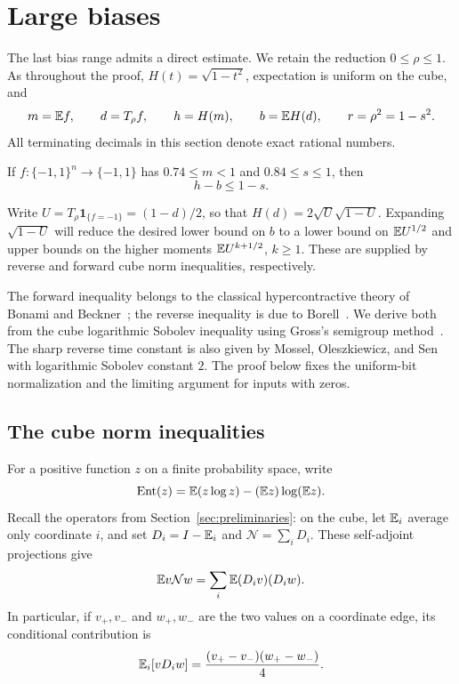 \section{Large biases}\label{sec:large-bias}

The last bias range admits a direct estimate. We retain the reduction
$0\le\rho\le1$. As throughout the proof, $H(t)=\sqrt{1-t^2}$,
expectation is uniform on the cube, and
\[
 m=\mathbb E f,\qquad d=T_\rho f,\qquad h=H(m),\qquad
 b=\mathbb E H(d),\qquad r=\rho^2=1-s^2.
\]
All terminating decimals in this section denote exact rational numbers.

\begin{proposition}\label{prop:large-bias}
If $f:\{-1,1\}^n\to\{-1,1\}$ has $0.74\le m<1$ and
$0.84\le s\le1$, then
\[
 h-b\le1-s.
\]
\end{proposition}

Write \(U=T_\rho\mathbf1_{\{f=-1\}}=(1-d)/2\), so that
\(H(d)=2\sqrt U\sqrt{1-U}\). Expanding \(\sqrt{1-U}\) will
reduce the desired lower bound on \(b\) to a lower bound on
\(\mathbb E U^{1/2}\) and upper bounds on the higher moments
\(\mathbb E U^{k+1/2}\), \(k\ge1\). These are supplied by reverse and
forward cube norm inequalities, respectively.

The forward inequality belongs to the classical hypercontractive
theory of Bonami and Beckner~\cite{Bonami70,Beckner75}; the reverse
inequality is due to Borell~\cite{Borell82}. We derive both from the
cube logarithmic Sobolev inequality using Gross's semigroup
method~\cite{Gross75}. The sharp reverse time constant is also given
by Mossel, Oleszkiewicz, and Sen~\cite[Equation~(1.2) and Theorem~1.10]{MOS13}
with logarithmic Sobolev constant $2$. The proof below fixes the
uniform-bit normalization and the limiting argument for inputs with zeros.

\subsection{The cube norm inequalities}

For a positive function $z$ on a finite probability space, write
\[
 \operatorname{Ent}(z)
 =\mathbb E(z\log z)-(\mathbb E z)\log(\mathbb E z).
\]
Recall the operators from Section~\ref{sec:preliminaries}: on the cube,
let $\mathbb E_i$ average only coordinate $i$, and set
$D_i=I-\mathbb E_i$ and $\mathcal N=\sum_iD_i$.
These self-adjoint projections give
\begin{equation}\label{lb:dirichlet}
 \mathbb E v\mathcal N w=\sum_i\mathbb E(D_iv)(D_iw).
\end{equation}
In particular, if $v_+,v_-$ and $w_+,w_-$ are the two values on a
coordinate edge, its conditional contribution is
\[
 \mathbb E_i[vD_iw]=\frac{(v_+-v_-)(w_+-w_-)}4.
\]

